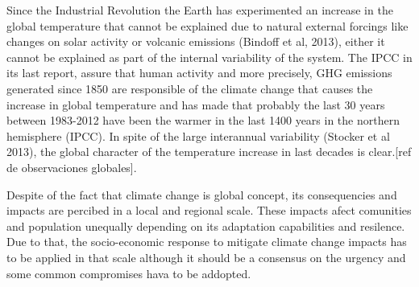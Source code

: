 Since the Industrial Revolution the Earth has experimented an increase in the global temperature that cannot be explained due to natural external forcings like changes on solar activity or volcanic emissions (Bindoff et al, 2013), either it cannot be explained as part of the internal variability of the system. The IPCC in its last report, assure that human activity and more precisely, GHG emissions generated since 1850 are responsible of the climate change that causes the increase in global temperature and has made that probably the last 30 years between 1983-2012 have been the warmer in the last 1400 years in the northern hemisphere (IPCC). In spite of the large interannual variability (Stocker et al 2013), the global character of the temperature increase in last decades is clear.[ref de observaciones globales].



Despite of the fact that climate change is global concept, its consequencies and impacts are percibed in a local and regional scale. These impacts afect comunities and population unequally depending on its adaptation capabilities and resilence. Due to that, the socio-economic response to mitigate climate change impacts has to be applied in that scale although it should be a consensus on the urgency and some common compromises hava to be addopted.


